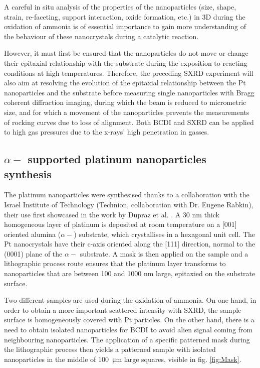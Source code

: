 A careful in situ analysis of the properties of the nanoparticles (size, shape, strain, re-faceting, support interaction, oxide formation, etc.) in 3D during the oxidation of ammonia is of essential importance to gain more understanding of the behaviour of these nanocrystals during a catalytic reaction.

However, it must first be ensured that the nanoparticles do not move or change their epitaxial relationship with the substrate during the exposition to reacting conditions at high temperatures.
Therefore, the preceding SXRD experiment will also aim at resolving the evolution of the epitaxial relationship between the Pt nanoparticles and the  substrate before measuring single nanoparticles with Bragg coherent diffraction imaging, during which the beam is reduced to micrometric size, and for which a movement of the nanoparticles prevents the measurements of rocking curves due to loss of alignment.
Both BCDI and SXRD can be applied to high gas pressures due to the x-rays’ high penetration in gasses.

\subsection{$\alpha-$ supported platinum nanoparticles synthesis}\label{sec:PtParticles}

The platinum nanoparticles were synthesised thanks to a collaboration with the Israel Institute of Technology (Technion, collaboration with Dr. Eugene Rabkin), their use first showcased in the work by Dupraz et al. \parencite*{Dupraz2017}.
A 30 nm thick homogeneous layer of platinum is deposited at room temperature on a [001] oriented alumina ($\alpha-$) substrate, which crystallises in a hexagonal unit cell.
The Pt nanocrystals have their c-axis oriented along the [111] direction, normal to the (0001) plane of the $\alpha-$ substrate.
A mask is then applied on the sample and a lithographic process route ensures that the platinum layer transforms to nanoparticles that are between 100 and 1000 nm large, epitaxied on the substrate surface.

Two different samples are used during the oxidation of ammonia.
On one hand, in order to obtain a more important scattered intensity with SXRD, the sample surface is homogeneously covered with Pt particles.
On the other hand, there is a need to obtain isolated nanoparticles for BCDI to avoid alien signal coming from neighbouring nanoparticles.
The application of a specific patterned mask during the lithographic process then yields a patterned sample with isolated nanoparticles in the middle of \qty{100}{\um} large squares, visible in fig. \ref{fig:Mask}.

